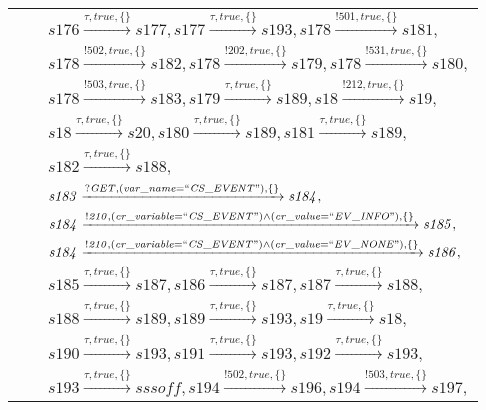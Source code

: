 \begin{tabular}{lcl}
& & $\mathit{s176}\xrightarrow{\mathit{\tau}, \mathit{true}, \{\}}\mathit{s177},\mathit{s177}\xrightarrow{\mathit{\tau}, \mathit{true}, \{\}}\mathit{s193},\mathit{s178}\xrightarrow{\mathit{!501}, \mathit{true}, \{\}}\mathit{s181},$ \\
& & $\mathit{s178}\xrightarrow{\mathit{!502}, \mathit{true}, \{\}}\mathit{s182},\mathit{s178}\xrightarrow{\mathit{!202}, \mathit{true}, \{\}}\mathit{s179},\mathit{s178}\xrightarrow{\mathit{!531}, \mathit{true}, \{\}}\mathit{s180},$ \\
& & $\mathit{s178}\xrightarrow{\mathit{!503}, \mathit{true}, \{\}}\mathit{s183},\mathit{s179}\xrightarrow{\mathit{\tau}, \mathit{true}, \{\}}\mathit{s189},\mathit{s18}\xrightarrow{\mathit{!212}, \mathit{true}, \{\}}\mathit{s19},$ \\
& & $\mathit{s18}\xrightarrow{\mathit{\tau}, \mathit{true}, \{\}}\mathit{s20},\mathit{s180}\xrightarrow{\mathit{\tau}, \mathit{true}, \{\}}\mathit{s189},\mathit{s181}\xrightarrow{\mathit{\tau}, \mathit{true}, \{\}}\mathit{s189},$ \\
& & $\mathit{s182}\xrightarrow{\mathit{\tau}, \mathit{true}, \{\}}\mathit{s188},$ \\
& & $\mathit{s183}\xrightarrow{\mathit{?GET}, \mathit{(var\_name = ``CS\_EVENT")}, \{\}}\mathit{s184},$ \\
& & $\mathit{s184}\xrightarrow{\mathit{!210}, \mathit{(cr\_variable = ``CS\_EVENT") \land (cr\_value = ``EV\_INFO")}, \{\}}\mathit{s185},$ \\
& & $\mathit{s184}\xrightarrow{\mathit{!210}, \mathit{(cr\_variable = ``CS\_EVENT") \land (cr\_value = ``EV\_NONE")}, \{\}}\mathit{s186},$ \\
& & $\mathit{s185}\xrightarrow{\mathit{\tau}, \mathit{true}, \{\}}\mathit{s187},\mathit{s186}\xrightarrow{\mathit{\tau}, \mathit{true}, \{\}}\mathit{s187},\mathit{s187}\xrightarrow{\mathit{\tau}, \mathit{true}, \{\}}\mathit{s188},$ \\
& & $\mathit{s188}\xrightarrow{\mathit{\tau}, \mathit{true}, \{\}}\mathit{s189},\mathit{s189}\xrightarrow{\mathit{\tau}, \mathit{true}, \{\}}\mathit{s193},\mathit{s19}\xrightarrow{\mathit{\tau}, \mathit{true}, \{\}}\mathit{s18},$ \\
& & $\mathit{s190}\xrightarrow{\mathit{\tau}, \mathit{true}, \{\}}\mathit{s193},\mathit{s191}\xrightarrow{\mathit{\tau}, \mathit{true}, \{\}}\mathit{s193},\mathit{s192}\xrightarrow{\mathit{\tau}, \mathit{true}, \{\}}\mathit{s193},$ \\
& & $\mathit{s193}\xrightarrow{\mathit{\tau}, \mathit{true}, \{\}}\mathit{sssoff},\mathit{s194}\xrightarrow{\mathit{!502}, \mathit{true}, \{\}}\mathit{s196},\mathit{s194}\xrightarrow{\mathit{!503}, \mathit{true}, \{\}}\mathit{s197},$ \\

\end{tabular}
